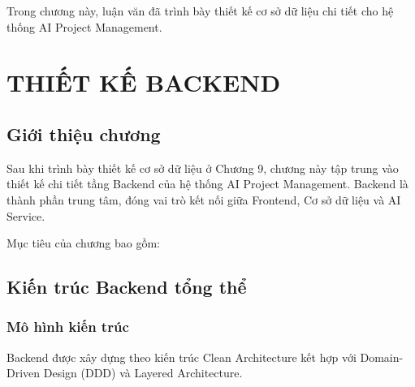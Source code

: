 \documentclass[12pt,a4paper]{report}
\begin{document}

Trong chương này, luận văn đã trình bày thiết kế cơ sở dữ liệu chi tiết cho hệ thống AI Project Management.

\chapter{THIẾT KẾ BACKEND}
\label{chap:backend_design}

\section{Giới thiệu chương}

Sau khi trình bày thiết kế cơ sở dữ liệu ở Chương 9, chương này tập trung vào thiết kế chi tiết tầng Backend của hệ thống AI Project Management. Backend là thành phần trung tâm, đóng vai trò kết nối giữa Frontend, Cơ sở dữ liệu và AI Service.

Mục tiêu của chương bao gồm:
\section{Kiến trúc Backend tổng thể}

\subsection{Mô hình kiến trúc}

Backend được xây dựng theo kiến trúc Clean Architecture kết hợp với Domain-Driven Design (DDD) và Layered Architecture.
\end{document}
